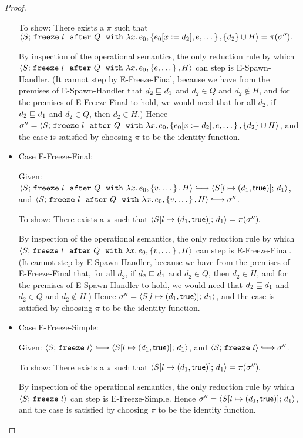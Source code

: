 \begin{proof}
\begin{itemize}
    To show: There exists a $\pi$ such that
    $\langle S;\, \mbox{\texttt{freeze}}~l~~{\mbox{\texttt{after}}}~Q~~{\mbox{\texttt{with}}}~\lambda x.\,e_0, \left\{e_0[x := d_2],
          e, \dots\right\}, \{d_2\}\cup H \rangle = \pi(\sigma'').$

    By inspection of the operational semantics, the only reduction
    rule by which
    $\langle S;\, \mbox{\texttt{freeze}}~l~~{\mbox{\texttt{after}}}~Q~~{\mbox{\texttt{with}}}~\lambda x.\,e_0, \left\{e,
          \dots\right\}, H \rangle$ can step is {\sc E-Spawn-Handler}.  (It cannot
    step by {\sc E-Freeze-Final}, because we have from the premises of
    {\sc E-Spawn-Handler} that $d_2 \sqsubseteq d_1$ and $d_2 \in Q$ and
    $d_2 \notin H$, and for the premises of {\sc E-Freeze-Final} to
    hold, we would need that for all $d_2$, if $d_2 \sqsubseteq d_1$ and
    $d_2 \in Q$, then $d_2 \in H$.)  Hence $\sigma'' =
    \langle S;\, \mbox{\texttt{freeze}}~l~~{\mbox{\texttt{after}}}~Q~~{\mbox{\texttt{with}}}~\lambda x.\,e_0, \left\{e_0[x := d_2],
          e, \dots\right\}, \{d_2\}\cup H \rangle$, and the case is satisfied by
    choosing $\pi$ to be the identity function.

  \item Case {\sc E-Freeze-Final}:

    Given: $\config{S}{\freezeafterfull{l}{Q}{\lam{x}{e_0}}{\setof{v,
          \dots}}{H}} \parstepsto
    \config{\extS{S}{l}{d_1}{\frozentrue}}{d_1}$, and
    $\config{S}{\freezeafterfull{l}{Q}{\lam{x}{e_0}}{\setof{v,
          \dots}}{H}} \parstepsto \conf''$.

    To show: There exists a $\pi$ such that
    $\langle S[l \mapsto (d_1, \textsf{true})];\, d_1 \rangle = \pi(\sigma'').$

    By inspection of the operational semantics, the only reduction
    rule by which
    $\langle S;\, \mbox{\texttt{freeze}}~l~~{\mbox{\texttt{after}}}~Q~~{\mbox{\texttt{with}}}~\lambda x.\,e_0, \left\{v,
          \dots\right\}, H \rangle$ can step is {\sc E-Freeze-Final}.  (It cannot
    step by {\sc E-Spawn-Handler}, because we have from the premises
    of {\sc E-Freeze-Final} that, for all $d_2$, if $d_2 \sqsubseteq d_1$
    and $d_2 \in Q$, then $d_2 \in H$, and for the premises of {\sc
      E-Spawn-Handler} to hold, we would need that $d_2 \sqsubseteq d_1$
    and $d_2 \in Q$ and $d_2 \notin H$.)  Hence $\sigma'' =
    \langle S[l \mapsto (d_1, \textsf{true})];\, d_1 \rangle$, and the case is
    satisfied by choosing $\pi$ to be the identity function.

  \item Case {\sc E-Freeze-Simple}:

    Given: $\config{S}{\freeze{l}} \parstepsto
    \config{\extS{S}{l}{d_1}{\frozentrue}}{d_1}$, and
    $\config{S}{\freeze{l}} \parstepsto \conf''$.

    To show: There exists a $\pi$ such that
    $\langle S[l \mapsto (d_1, \textsf{true})];\, d_1 \rangle = \pi(\sigma'').$

    By inspection of the operational semantics, the only reduction
    rule by which $\langle S;\, \mbox{\texttt{freeze}}~l \rangle$ can step is {\sc
      E-Freeze-Simple}.  Hence $\sigma'' =
    \langle S[l \mapsto (d_1, \textsf{true})];\, d_1 \rangle$, and the case is
    satisfied by choosing $\pi$ to be the identity function.

  \end{itemize}
\end{proof}

